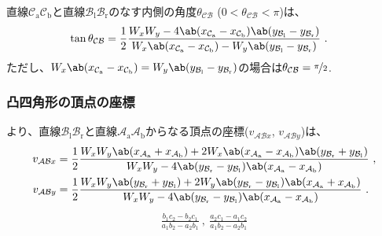 直線$\mathcal C_\mathrm a\mathcal C_\mathrm b$と直線$\mathcal B_\mathrm l\mathcal B_\mathrm r$のなす内側の角度$\theta_{\mathcal{CB}}$ ($0 < \theta_{\mathcal{CB}} < \pi$)は、
\begin{align*}
  \tan\theta_{\mathcal{CB}}
  &= \frac12
     \frac{W_xW_y
           -4\ab(x_{\mathcal C_\mathrm a}-x_{\mathcal C_\mathrm b})
             \ab(y_{\mathcal B_\mathrm l}-y_{\mathcal B_\mathrm r})}
          {W_x\ab(x_{\mathcal C_\mathrm a}-x_{\mathcal C_\mathrm b})
           -W_y\ab(y_{\mathcal B_\mathrm l}-y_{\mathcal B_\mathrm r})}\ .
\end{align*}
ただし、$W_x\ab(x_{\mathcal C_\mathrm a}-x_{\mathcal C_\mathrm b}) = W_y\ab(y_{\mathcal B_\mathrm l}-y_{\mathcal B_\mathrm r})$の場合は$\theta_{\mathcal{CB}} = \nicefrac\pi2$.

\clearpage
\subsubsection{凸四角形の頂点の座標}
より、直線$\mathcal B_\mathrm l\mathcal B_\mathrm r$と直線$\mathcal A_\mathrm a\mathcal A_\mathrm b$からなる頂点の座標($v_{\mathcal{AB}x}$, $v_{\mathcal{AB}y}$)は、
\begin{align*}
  v_{\mathcal{AB}x}
  &= \frac12\frac{
       W_xW_y\ab(x_{\mathcal A_\mathrm a}+x_{\mathcal A_\mathrm b})
       +2W_x\ab(x_{\mathcal A_\mathrm a}-x_{\mathcal A_\mathrm b})\ab(y_{\mathcal B_\mathrm r}+y_{\mathcal B_\mathrm l})
     }{
       W_xW_y
       -4\ab(y_{\mathcal B_\mathrm r}-y_{\mathcal B_\mathrm l})\ab(x_{\mathcal A_\mathrm a}-x_{\mathcal A_\mathrm b})
     }\ ,\\
  v_{\mathcal{AB}y}
  &= \frac12\frac{
       W_xW_y\ab(y_{\mathcal B_\mathrm r}+y_{\mathcal B_\mathrm l})
       +2W_y\ab(y_{\mathcal B_\mathrm r}-y_{\mathcal B_\mathrm l})\ab(x_{\mathcal A_\mathrm a}+x_{\mathcal A_\mathrm b})
     }{
       W_xW_y
       -4\ab(y_{\mathcal B_\mathrm r}-y_{\mathcal B_\mathrm l})\ab(x_{\mathcal A_\mathrm a}-x_{\mathcal A_\mathrm b})
     }\ .
\end{align*}
\begin{align*}
  \frac{b_1c_2-b_2c_1}{a_1b_2-a_2b_1}~,~
  \frac{a_2c_1-a_1c_2}{a_1b_2-a_2b_1}
\end{align*}

